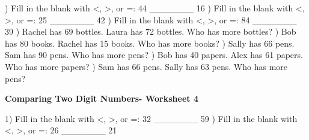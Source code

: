 \documentclass{article}%
\begin{document}
\newline%
\newline%
) Fill in the blank with <, >, or =: 44 \_\_\_\_\_\_\_ 16%
\newline%
\newline%
) Fill in the blank with <, >, or =: 25 \_\_\_\_\_\_\_ 42%
\newline%
\newline%
) Fill in the blank with <, >, or =: 84 \_\_\_\_\_\_\_ 39%
\newline%
\newline%
) Rachel has 69 bottles. Laura has 72 bottles. Who has more bottles?%
\newline%
\newline%
) Bob has 80 books. Rachel has 15 books. Who has more books?%
\newline%
\newline%
) Sally has 66 pens. Sam has 90 pens. Who has more pens?%
\newline%
\newline%
) Bob has 40 papers. Alex has 61 papers. Who has more papers?%
\newline%
\newline%
) Sam has 66 pens. Sally has 63 pens. Who has more pens?%
\newline%
\newline%
\newline%
\pagebreak%
\large%
\begin{center}%
\textbf{Comparing Two Digit Numbers- Worksheet 4}%
\newline%
\newline%
\newline%
\end{center} \normalsize%
1) Fill in the blank with <, >, or =: 32 \_\_\_\_\_\_\_ 59%
\newline%
\newline%
) Fill in the blank with <, >, or =: 26 \_\_\_\_\_\_\_ 21%
\newline%
\newline%
\newline%
\end{document}
